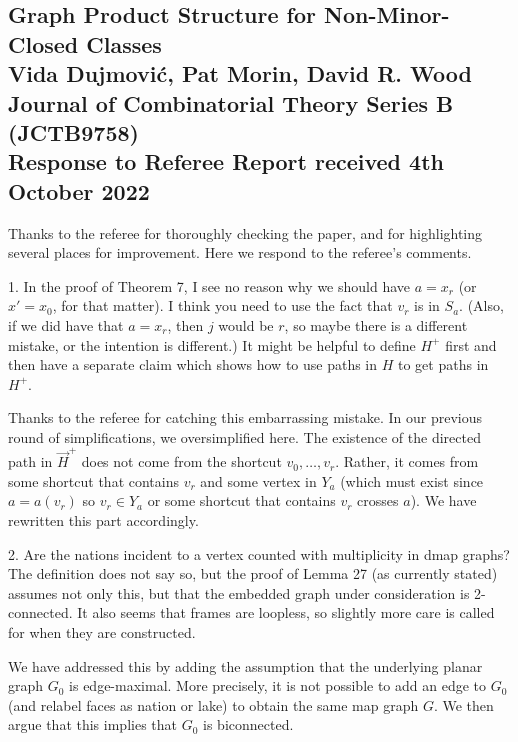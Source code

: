 \documentclass[12pt]{article}
\newenvironment{response}{\color{blue}}{}
\begin{document}
\subsection*{Graph Product Structure for Non-Minor-Closed Classes\\
Vida Dujmovi\'c, Pat Morin, David R. Wood\\
Journal of Combinatorial Theory Series B (JCTB9758)\\
Response to Referee Report received 4th October 2022}

Thanks to the referee for thoroughly checking the paper, and for highlighting several places for improvement. Here we respond to the referee's comments.

\hrulefill

1. In the proof of Theorem 7, I see no reason why we should have $a = x_r$
(or $x'=x_0$, for that matter). I think you need to use the fact that $v_r$ is
in $S_a$. (Also, if we did have that $a = x_r$, then $j$ would be $r$, so maybe
there is a different mistake, or the intention is different.) It might be
helpful to define $H^+$ first and then have a separate claim which shows
how to use paths in $H$ to get paths in $H^+$.

\begin{response}
  Thanks to the referee for catching this embarrassing mistake.  In our previous round of simplifications, we oversimplified here.  The existence of the directed path in $\overrightarrow{H}^+$ does not come from the shortcut $v_0,\ldots,v_r$.  Rather, it comes from some shortcut that contains $v_r$ and some vertex in $Y_a$ (which must exist since $a=a(v_r)$ so $v_r\in Y_a$ or some shortcut that contains $v_r$ crosses $a$).  We have rewritten this part accordingly.
\end{response}


2. Are the nations incident to a vertex counted with multiplicity in dmap graphs? The definition does not say so, but the proof of Lemma 27 (as currently stated) assumes not only this, but that the embedded graph under consideration is 2-connected.  It also seems that frames are loopless, so slightly more care is called for when they are constructed.

\begin{response}
  We have addressed this by adding the assumption that the underlying planar graph $G_0$ is edge-maximal. More precisely, it is not possible to add an edge to $G_0$ (and relabel faces as nation or lake) to obtain the same map graph $G$.  We then argue that this implies that $G_0$ is biconnected.
\end{response}
\end{document}
